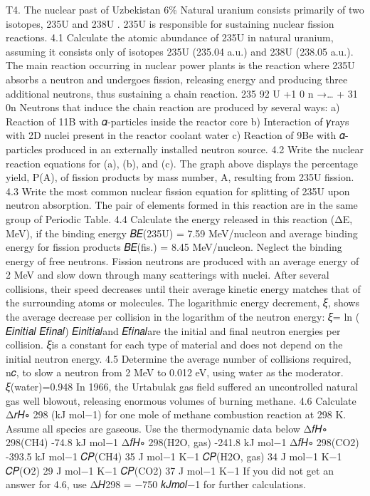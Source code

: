 T4. The nuclear past of Uzbekistan 6\% Natural uranium consists primarily of two isotopes, 235U and 238U . 235U is responsible for sustaining nuclear fission reactions. 4.1 Calculate the atomic abundance of 235U in natural uranium, assuming it consists only of isotopes 235U (235.04 a.u.) and 238U (238.05 a.u.). The main reaction occurring in nuclear power plants is the reaction where 235U absorbs a neutron and undergoes fission, releasing energy and producing three additional neutrons, thus sustaining a chain reaction. 235 92 U +1 0 n →… + 31 0n Neutrons that induce the chain reaction are produced by several ways: a) Reaction of 11B with 𝛼-particles inside the reactor core b) Interaction of 𝛾rays with 2D nuclei present in the reactor coolant water c) Reaction of 9Be with 𝛼-particles produced in an externally installed neutron source. 4.2 Write the nuclear reaction equations for (a), (b), and (c). The graph above displays the percentage yield, P(A), of fission products by mass number, A, resulting from 235U fission. 4.3 Write the most common nuclear fission equation for splitting of 235U upon neutron absorption. The pair of elements formed in this reaction are in the same group of Periodic Table. 4.4 Calculate the energy released in this reaction (ΔE, MeV), if the binding energy 𝐵𝐸(235U) = 7.59 MeV/nucleon and average binding energy for fission products 𝐵𝐸(fis.) = 8.45 MeV/nucleon. Neglect the binding energy of free neutrons. Fission neutrons are produced with an average energy of 2 MeV and slow down through many scatterings with nuclei. After several collisions, their speed decreases until their average kinetic energy matches that of the surrounding atoms or molecules. The logarithmic energy decrement, 𝜉, shows the average decrease per collision in the logarithm of the neutron energy: 𝜉= ln ( 𝐸𝑖𝑛𝑖𝑡𝑖𝑎𝑙 𝐸𝑓𝑖𝑛𝑎𝑙) 𝐸𝑖𝑛𝑖𝑡𝑖𝑎𝑙and 𝐸𝑓𝑖𝑛𝑎𝑙are the initial and final neutron energies per collision. 𝜉is a constant for each type of material and does not depend on the initial neutron energy. 4.5 Determine the average number of collisions required, n𝑐, to slow a neutron from 2 MeV to 0.012 eV, using water as the moderator. 𝜉(water)=0.948 In 1966, the Urtabulak gas field suffered an uncontrolled natural gas well blowout, releasing enormous volumes of burning methane. 4.6 Calculate Δ𝑟𝐻∘ 298 (kJ mol−1) for one mole of methane combustion reaction at 298 K. Assume all species are gaseous. Use the thermodynamic data below Δ𝑓𝐻∘ 298(CH4) -74.8 kJ mol−1 Δ𝑓𝐻∘ 298(H2O, gas) -241.8 kJ mol−1 Δ𝑓𝐻∘ 298(CO2) -393.5 kJ mol−1 𝐶𝑃(CH4) 35 J mol−1 K−1 𝐶𝑃(H2O, gas) 34 J mol−1 K−1 𝐶𝑃(O2) 29 J mol−1 K−1 𝐶𝑃(CO2) 37 J mol−1 K−1 If you did not get an answer for 4.6, use Δ𝐻298 = −750 𝑘𝐽𝑚𝑜𝑙−1 for further calculations.

